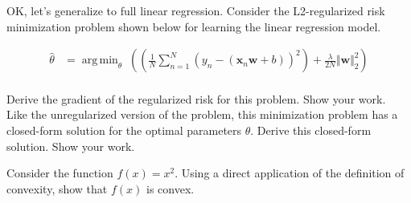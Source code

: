 \documentclass[11pt]{article}
\newcommand{\mbf}[1]{{\mathbf{#1}}}
\DeclareMathOperator*{\argmin}{arg\,min}
\begin{document}
\begin{problem}{8} OK, let's generalize to full linear regression. Consider the L2-regularized risk minimization problem shown below for learning the linear regression model. 

\begin{align*}    
    \hat{\theta}&=\argmin_{\theta}\;\left( \left(\frac{1}{N}\sum_{n=1}^N (y_n-(\mbf{x}_n\mbf{w}+b))^2 \right)+ \frac{\lambda}{2N}\Vert\mbf{w}\Vert_2^2 \right)
\end{align*}\\

 Derive the gradient of the regularized risk for this problem. Show your work.\\


 Like the unregularized version of the problem, this minimization problem has a closed-form solution for the optimal parameters $\hat{\theta}$.
Derive this closed-form solution. Show your work.
    
\end{problem}

\begin{problem}{5} Consider the function $f(x)=x^2$. Using a direct application of the definition of convexity, show that $f(x)$ is convex. 
\end{problem}
\end{document}
